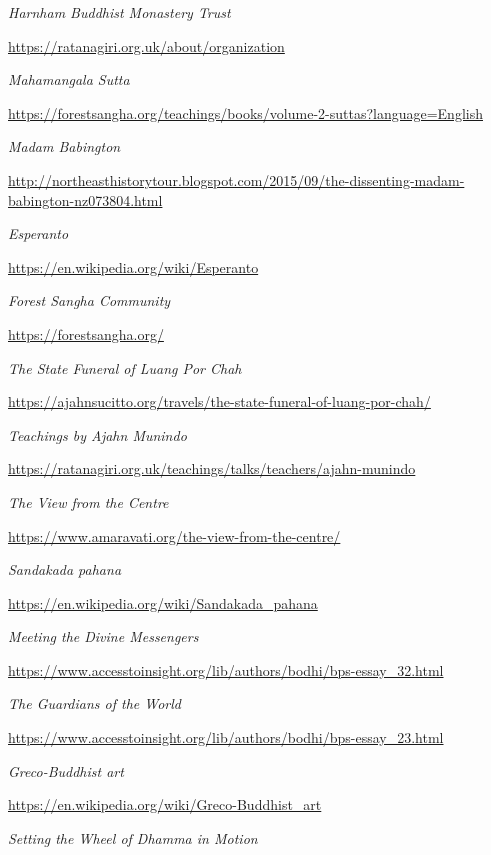 \begin{thebibliography}{9}
 \emph{Harnham Buddhist Monastery Trust}

  {\urlsize \url{https://ratanagiri.org.uk/about/organization}}

 \emph{Mahamangala Sutta}

  {\urlsize \url{https://forestsangha.org/teachings/books/volume-2-suttas?language=English}}

 \emph{Madam Babington}

  {\urlsize \url{http://northeasthistorytour.blogspot.com/2015/09/the-dissenting-madam-babington-nz073804.html}}

 \emph{Esperanto}

  {\urlsize \url{https://en.wikipedia.org/wiki/Esperanto}}

 \emph{Forest Sangha Community}

  {\urlsize \url{https://forestsangha.org/}}

 \emph{The State Funeral of Luang Por Chah}

  {\urlsize \url{https://ajahnsucitto.org/travels/the-state-funeral-of-luang-por-chah/}}

 \emph{Teachings by Ajahn Munindo}

  {\urlsize \url{https://ratanagiri.org.uk/teachings/talks/teachers/ajahn-munindo}}

 \emph{The View from the Centre}

  {\urlsize \url{https://www.amaravati.org/the-view-from-the-centre/}}

 \emph{Sandakada pahana}

  {\urlsize \url{https://en.wikipedia.org/wiki/Sandakada_pahana}}

 \emph{Meeting the Divine Messengers}

  {\urlsize \url{https://www.accesstoinsight.org/lib/authors/bodhi/bps-essay_32.html}}

 \emph{The Guardians of the World}

  {\urlsize \url{https://www.accesstoinsight.org/lib/authors/bodhi/bps-essay_23.html}}

 \emph{Greco-Buddhist art}

  {\urlsize \url{https://en.wikipedia.org/wiki/Greco-Buddhist_art}}

 \emph{Setting the Wheel of Dhamma in Motion}


\end{thebibliography}
